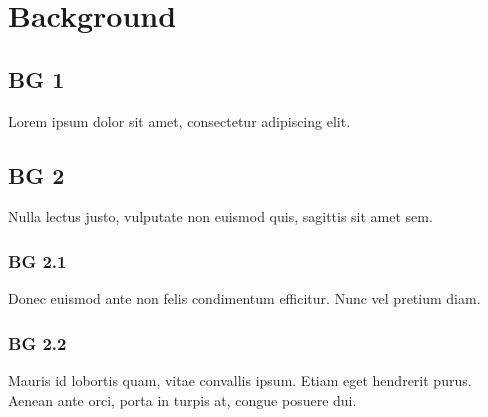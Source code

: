 \chapter{Background}



\section{BG 1}
  Lorem ipsum dolor sit amet, consectetur adipiscing elit.

\section{BG 2}
  Nulla lectus justo, vulputate non euismod quis, sagittis sit amet sem.
  \subsection{BG 2.1}
    Donec euismod ante non felis condimentum efficitur. Nunc vel pretium diam.
  \subsection{BG 2.2}
    Mauris id lobortis quam, vitae convallis ipsum. Etiam eget hendrerit purus.
    Aenean ante orci, porta in turpis at, congue posuere dui.

